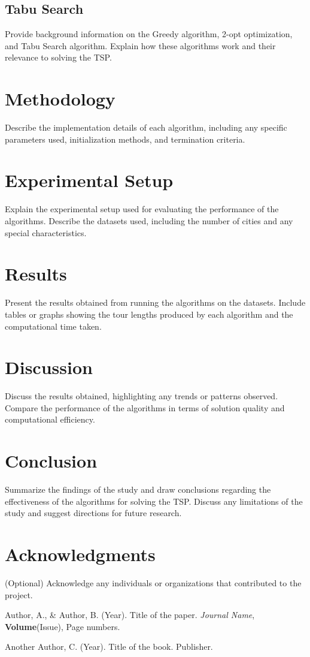 \documentclass{article}
\begin{document}
\subsection{Tabu Search}
Provide background information on the Greedy algorithm, 2-opt optimization, and Tabu Search algorithm. Explain how these algorithms 
work and their relevance to solving the TSP.

\section{Methodology}
Describe the implementation details of each algorithm, including any specific parameters used, initialization methods, and termination criteria.

\section{Experimental Setup}
Explain the experimental setup used for evaluating the performance of the algorithms. Describe the datasets used, including the number 
of cities and any special characteristics.

\section{Results}
Present the results obtained from running the algorithms on the datasets. Include tables or graphs showing the tour lengths produced 
by each algorithm and the computational time taken.

\section{Discussion}
Discuss the results obtained, highlighting any trends or patterns observed. Compare the performance of the algorithms in terms of solution 
quality and computational efficiency.

\section{Conclusion}
Summarize the findings of the study and draw conclusions regarding the effectiveness of the algorithms for solving the TSP.
Discuss any limitations of the study and suggest directions for future research.

\section*{Acknowledgments}
(Optional) Acknowledge any individuals or organizations that contributed to the project.

\begin{thebibliography}{9}
    Author, A., \& Author, B. (Year). Title of the paper. \textit{Journal Name}, \textbf{Volume}(Issue), Page numbers.

    Another Author, C. (Year). Title of the book. Publisher.
\end{thebibliography}
\end{document}
